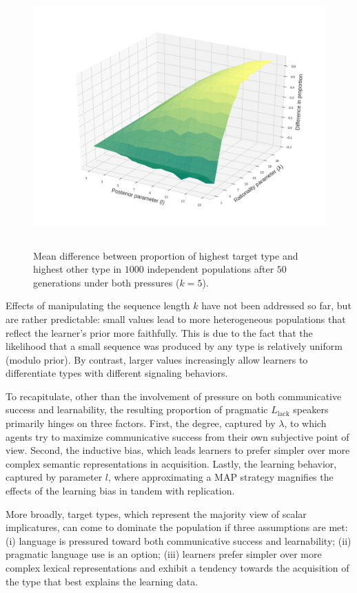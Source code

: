 \documentclass[a4paper, 11pt]{article}
\theoremstyle{Satz}
\newcommand{\mylang}[1]{\ensuremath{L_{\text{#1}}}\xspace} %
\newcommand{\Llack}{\mylang{lack}}
\begin{document}
\begin{figure}[t]
\centering
\includegraphics[width=1\textwidth,height=10cm,keepaspectratio]{./plots/fig4-3d-incumbents-difference} %
\caption{Mean difference between proportion of highest target type and highest other type in
  $1000$ independent populations after $50$ generations under both pressures ($k = 5$).}
\label{fig:diff}
\end{figure}

Effects of manipulating the sequence length $k$ have not been addressed so far, but are rather
predictable: small values lead to more heterogeneous populations that reflect the learner's
prior more faithfully. This is due to the fact that the likelihood that a small sequence was
produced by any type is relatively uniform (modulo prior). By contrast, larger values
increasingly allow learners to differentiate types with different signaling behaviors.

To recapitulate, other than the involvement of pressure on both communicative success and learnability,
the resulting proportion of pragmatic $\Llack$ speakers primarily hinges on three
factors. First, the degree, captured by $\lambda$, to which agents try to maximize
communicative success from their own subjective point of view. Second, the inductive bias,
which leads learners to prefer simpler over more complex semantic representations in
acquisition. Lastly, the learning behavior, captured by parameter $l$, where approximating a
MAP strategy magnifies the effects of the learning bias in tandem with replication.

More broadly,
target types, which represent the majority view of scalar implicatures, can come to
dominate the population if three assumptions are met: (i) language is pressured toward both
communicative success and learnability; (ii) pragmatic language use is an option; (iii) learners prefer
simpler over more complex lexical representations and exhibit a tendency towards the
acquisition of the type that best explains the learning data.
\end{document}
